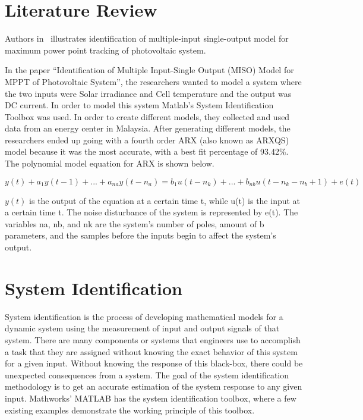 \documentclass[letterpaper,12pt]{article}   %
\begin{document}
 \section{Literature Review}

Authors in~\cite{Hussain2011} illustrates identification of multiple-input single-output model for maximum power point tracking of photovoltaic system.  
 
In the paper “Identification of Multiple Input-Single Output (MISO) Model for MPPT of Photovoltaic System”, the researchers wanted to model a system where the two inputs were Solar irradiance and Cell temperature and the output was DC current. In order to model this system Matlab’s System Identification Toolbox was used. In order to create different models, they collected and used data from an energy center in Malaysia. After generating different models, the researchers ended up going with a fourth order ARX (also known as ARXQS) model because it was the most accurate, with a best fit percentage of 93.42\%. The polynomial model equation for ARX is shown below. 

$y(t) + a_1y(t - 1) +...+a_{na}y(t - n_{a}) = b_{1}u(t-n_{k})+...+b_{nb}u(t - n_{k}-n_{b}+1) + e(t)$

$y(t)$ is the output of the equation at a certain time t, while u(t) is the input at a certain time t. The noise disturbance of the system is represented by e(t). The variables na, nb, and nk are the system’s number of poles, amount of b parameters, and the samples before the inputs begin to affect the system’s output.



\section{System Identification}

System identification is the process of developing mathematical models for a dynamic system using the measurement of input and output signals of that system. There are many components or systems that engineers use to accomplish a task that they are assigned without knowing the exact behavior of this system for a given input. Without knowing the response of this black-box, there could be unexpected consequences from a system. The goal of the system identification methodology is to get an accurate estimation of the system response to any given input. Mathworks' MATLAB has the system identification toolbox, where a few existing examples demonstrate the working principle of this toolbox.
\end{document}
